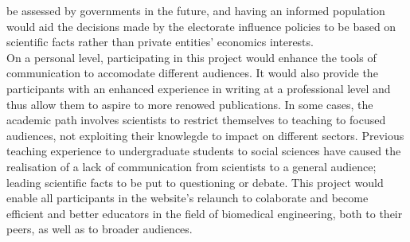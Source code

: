 be assessed by governments in the future, and having an informed population
would aid the decisions made by the electorate influence policies to be based
on scientific facts rather than private entities' economics
interests.\medskip\\ On a personal level, participating in this
project would enhance the tools of communication to accomodate different
audiences. It would also provide the participants with an enhanced experience
in writing at a professional level and thus allow them to aspire to more
renowed publications.
In some cases, the academic path involves scientists to restrict
themselves to teaching to focused audiences, not exploiting their knowlegde
to impact on different sectors. Previous teaching experience to undergraduate
students to social sciences have caused the realisation of a lack of
communication from scientists to a general audience; leading scientific
facts to be put to questioning or debate. This project would enable all
participants in the website's relaunch to colaborate and become efficient
and better educators in the field of biomedical engineering, both to their
peers, as well as to broader audiences.
